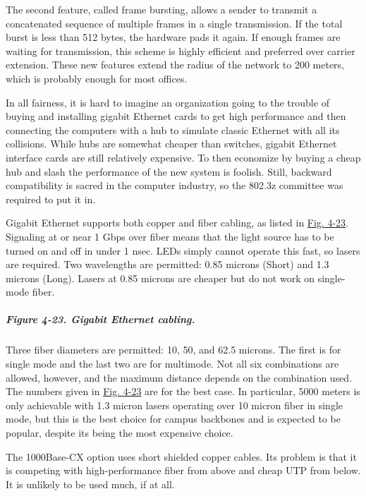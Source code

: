 The second feature, called {frame bursting}, allows a sender to transmit
a concatenated sequence of multiple frames in a single transmission. If
the total burst is less than 512 bytes, the hardware pads it again. If
enough frames are waiting for transmission, this scheme is highly
efficient and preferred over carrier extension. These new features
extend the radius of the network to 200 meters, which is probably enough
for most offices.

In all fairness, it is hard to imagine an organization going to the
trouble of buying and installing gigabit Ethernet cards to get high
performance and then connecting the computers with a hub to simulate
classic Ethernet with all its collisions. While hubs are somewhat
cheaper than switches, gigabit Ethernet interface cards are still
relatively expensive. To then economize by buying a cheap hub and slash
the performance of the new system is foolish. Still, backward
compatibility is sacred in the computer industry, so the 802.3z
committee was required to put it in.

Gigabit Ethernet supports both copper and fiber cabling, as listed in
\protect\hyperlink{0130661023_ch04lev1sec3.htmlux5cux23ch04fig23}{Fig.
4-23}. Signaling at or near 1 Gbps over fiber means that the light
source has to be turned on and off in under 1 nsec. LEDs simply cannot
operate this fast, so lasers are required. Two wavelengths are
permitted: 0.85 microns (Short) and 1.3 microns (Long). Lasers at 0.85
microns are cheaper but do not work on single-mode fiber.

\subparagraph[Figure 4-23. Gigabit Ethernet
cabling.]{\texorpdfstring{\protect\hypertarget{0130661023_ch04lev1sec3.htmlux5cux23ch04fig23}{}{}Figure
4-23. Gigabit Ethernet
cabling.}{Figure 4-23. Gigabit Ethernet cabling.}}


Three fiber diameters are permitted: 10, 50, and 62.5 microns. The first
is for single mode and the last two are for multimode. Not all six
combinations are allowed, however, and the maximum distance depends on
the combination used. The numbers given in
\protect\hyperlink{0130661023_ch04lev1sec3.htmlux5cux23ch04fig23}{Fig.
4-23} are for the best case. In particular, 5000 meters is only
achievable with 1.3 micron lasers operating over 10 micron fiber in
single mode, but this is the best choice for campus backbones and is
expected to be popular, despite its being the most expensive choice.

The 1000Base-CX option uses short shielded copper cables. Its problem is
that it is competing with high-performance fiber from above and cheap
UTP from below. It is unlikely to be used much, if at all.

